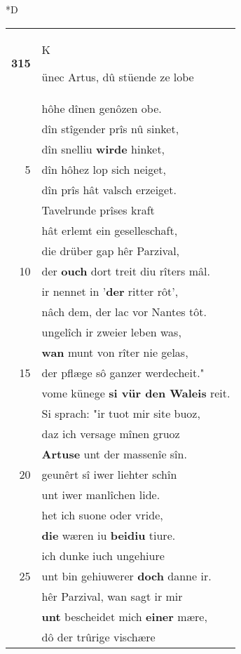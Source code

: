 \documentclass[8pt,a4paper,notitlepage]{article}
\begin{document}
\begin{table}[ht]
\begin{minipage}[t]{0.5\linewidth}
\small
\begin{center}*D
\end{center}
\begin{tabular}{rl}
\textbf{315} & \begin{large}K\end{large}ünec Artus, dû stüende ze lobe\\ 
 & hôhe dînen genôzen obe.\\ 
 & dîn stîgender prîs nû sinket,\\ 
 & dîn snelliu \textbf{wirde} hinket,\\ 
5 & dîn hôhez lop sich neiget,\\ 
 & dîn prîs hât valsch erzeiget.\\ 
 & Tavelrunde prîses kraft\\ 
 & hât erlemt ein geselleschaft,\\ 
 & die drüber gap hêr Parzival,\\ 
10 & der \textbf{ouch} dort treit diu rîters mâl.\\ 
 & ir nennet in '\textbf{der} ritter rôt',\\ 
 & nâch dem, der lac vor Nantes tôt.\\ 
 & ungelîch ir zweier leben was,\\ 
 & \textbf{wan} munt von rîter nie gelas,\\ 
15 & der pflæge sô ganzer werdecheit."\\ 
 & vome künege \textbf{si vür den Waleis} reit.\\ 
 & Si sprach: "ir tuot mir site buoz,\\ 
 & daz ich versage mînen gruoz\\ 
 & \textbf{Artuse} unt der massenîe sîn.\\ 
20 & geunêrt sî iwer liehter schîn\\ 
 & unt iwer manlîchen lide.\\ 
 & het ich suone oder vride,\\ 
 & \textbf{die} wæren iu \textbf{beidiu} tiure.\\ 
 & ich dunke iuch ungehiure\\ 
25 & unt bin gehiuwerer \textbf{doch} danne ir.\\ 
 & hêr Parzival, wan sagt ir mir\\ 
 & \textbf{unt} bescheidet mich \textbf{einer} mære,\\ 
 & dô der trûrige vischære\\ 

\end{tabular}
\end{minipage}
\end{table}
\end{document}
